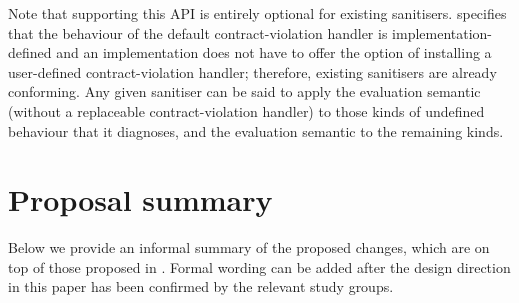 Note that supporting this API is entirely optional for existing sanitisers. \cite{P2900R8} specifies that the behaviour of the default contract-violation handler is implementation-defined and an implementation does not have to offer the option of installing a user-defined contract-violation handler; therefore, existing sanitisers are already conforming. Any given sanitiser can be said to apply the  evaluation semantic (without a replaceable contract-violation handler) to those kinds of undefined behaviour that it diagnoses, and the  evaluation semantic to the remaining kinds.

\section{Proposal summary}
Below we provide an informal summary of the proposed changes, which are on top of those proposed in \cite{P2900R8}. Formal wording can be added after the design direction in this paper has been confirmed by the relevant study groups.

